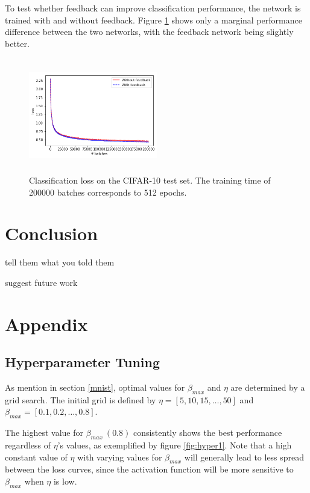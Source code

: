 \documentclass{article}
\begin{document}
To test whether feedback can improve classification performance, the network is trained with and without feedback. Figure \ref{fig:cifarclass} shows only a marginal performance difference between the two networks, with the feedback network being slightly better. 

\begin{figure}
      \centering
      \includegraphics[width=0.5\textwidth,height=5cm,keepaspectratio]{img/cifar_class_test_loss.png}
      \caption{Classification loss on the CIFAR-10 test set. The training time of 200000 batches corresponds to 512 epochs.}
      \label{fig:cifarclass}
  \end{figure}
  
\section{Conclusion}
tell them what you told them 

suggest future work 




\newpage


\section{Appendix}

\subsection{Hyperparameter Tuning} 
As mention in section \ref{mnist}, optimal values for $\beta_{max}$ and $\eta$ are determined by a grid search. The initial grid is defined by $\eta = [5, 10, 15, \dots, 50]$ and $\beta_{max} = [0.1, 0.2, \dots, 0.8]$. 

The highest value for $\beta_{max} \ (0.8)$ consistently shows the best performance regardless of $\eta$'s values, as exemplified by figure \ref{fig:hyper1}. Note that a high constant value of $\eta$ with varying values for $\beta_{max}$ will generally lead to less spread between the loss curves, since the activation function will be more sensitive to $\beta_{max}$ when $\eta$ is low. 
\end{document}

